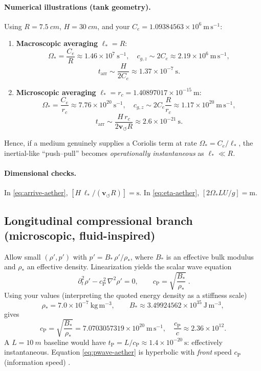 \documentclass[12pt]{article}
\begin{document}
\paragraph{Numerical illustrations (tank geometry).}
Using $R=\SI{7.5}{cm}$, $H=\SI{30}{cm}$, and your $C_e=1.09384563\times 10^{6}\ \mathrm{m\,s^{-1}}$:
\begin{enumerate}
\item \textbf{Macroscopic averaging} $\ell_*=R$:
\[
\Omega_*=\frac{C_e}{R}\approx 1.46\times 10^{7}\ \mathrm{s^{-1}},\quad
c_{g,z}\sim 2C_e\approx 2.19\times 10^{6}\ \mathrm{m\,s^{-1}},
\]
\[
t_{\mathrm{arr}}\sim \frac{H}{2C_e}\approx 1.37\times 10^{-7}\ \mathrm{s}.
\]
\item \textbf{Microscopic averaging} $\ell_*=r_c=1.40897017\times10^{-15}\ \mathrm{m}$:
\[
\Omega_*=\frac{C_e}{r_c}\approx 7.76\times 10^{20}\ \mathrm{s^{-1}},\quad
c_{g,z}\sim 2C_e\frac{R}{r_c}\approx 1.17\times 10^{20}\ \mathrm{m\,s^{-1}},
\]
\[
t_{\mathrm{arr}}\sim \frac{H\,r_c}{2\mathbf{v}_{\scriptscriptstyle\boldsymbol{\circlearrowleft}} R}\approx 2.6\times 10^{-21}\ \mathrm{s}.
\]
\end{enumerate}
Hence, if a medium genuinely supplies a Coriolis term at rate $\Omega_*=C_e/\ell_*$, the inertial-like ``push--pull'' becomes \emph{operationally instantaneous} as $\ell_*\!\ll\!R$.

\paragraph{Dimensional checks.}
In \eqref{eq:arrive-aether}, $[H\,\ell_* /(\mathbf{v}_{\scriptscriptstyle\boldsymbol{\circlearrowleft}} R)]=\mathrm{s}$. In \eqref{eq:eta-aether}, $[2\Omega_* L U/g]=\mathrm{m}$.

\subsection{Longitudinal compressional branch (microscopic, fluid-inspired)}
\label{sec:aether-longitudinal}
Allow small $(\rho',p')$ with $p'=B_*\,\rho'/\rho_*$, where $B_*$ is an effective bulk modulus and $\rho_*$ an effective density. Linearization yields the scalar wave equation \cite{LandauFluids,Lighthill78}
\begin{equation}
\boxed{\;\partial_t^2 \rho' - c_{\mathrm{P}}^{\,2}\,\nabla^2 \rho' = 0,\qquad
c_{\mathrm{P}}=\sqrt{\frac{B_*}{\rho_*}}\;.}
\label{eq:pwave-aether}
\end{equation}
Using your values (interpreting the quoted energy density as a stiffness scale)
\[
\rho_* = 7.0\times 10^{-7}\ \mathrm{kg\,m^{-3}},\qquad
B_* \approx 3.49924562\times 10^{35}\ \mathrm{J\,m^{-3}},
\]
gives
\[
c_{\mathrm{P}}=\sqrt{\frac{B_*}{\rho_*}}
= 7.0703057319\times 10^{20}\ \mathrm{m\,s^{-1}},
\quad
\frac{c_{\mathrm{P}}}{c}\approx 2.36\times 10^{12}.
\]
A $L=\SI{10}{m}$ baseline would have $t_{\mathrm{P}}=L/c_{\mathrm{P}}\approx 1.4\times 10^{-20}\ \mathrm{s}$: effectively instantaneous. Equation \eqref{eq:pwave-aether} is hyperbolic with \emph{front} speed $c_{\mathrm{P}}$ (information speed) \cite{Brillouin1960}.
\end{document}
